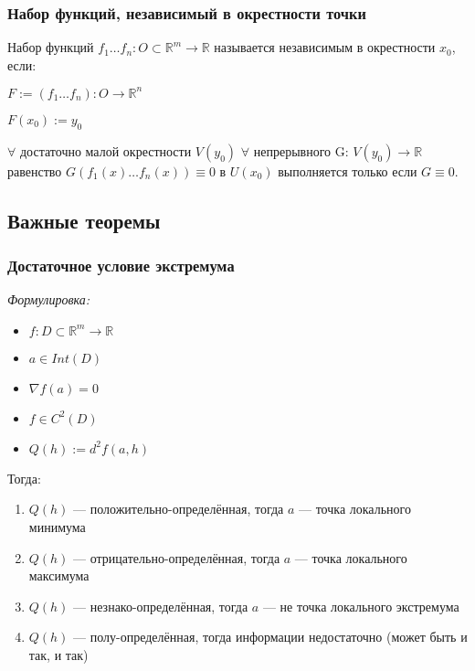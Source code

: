 \documentclass{article}
\begin{document}
\subsubsection{Набор функций, независимый в окрестности точки}


Набор функций $f_1 \ldots f_n: O \subset \mathbb{R}^m \rightarrow \mathbb{R}$ называется независимым в окрестности $x_0$, если:

$F := (f_1 \ldots f_n): O \rightarrow \mathbb{R}^n$

$F(x_0) := y_0$

$\forall$ достаточно малой окрестности $V(y_0)$ $\forall$ непрерывного G: $V(y_0) \rightarrow \mathbb{R}$ равенство $G(f_1(x) \ldots f_n(x)) \equiv 0 $ в $ U(x_0)$ выполняется только если $G \equiv 0$.

\newpage
\subsection{Важные теоремы}
\subsubsection{Достаточное условие экстремума}

\textit{Формулировка:}

\begin{itemize}
    \item $f: D \subset \mathbb{R}^m \rightarrow \mathbb{R}$
    \item $a \in Int(D)$
    \item $\nabla f (a) = 0$
    \item $f \in C^2(D)$
    \item $Q(h) := d^2f(a, h)$
\end{itemize}

Тогда: 

\begin{enumerate}
    \item $Q(h)$ --- положительно-определённая, тогда $a$ --- точка локального минимума
    \item $Q(h)$ --- отрицательно-определённая, тогда $a$ --- точка локального максимума
    \item $Q(h)$ --- незнако-определённая, тогда $a$ --- не точка локального экстремума
    \item $Q(h)$ --- полу-определённая, тогда информации недостаточно (может быть и так, и так)
\end{enumerate}
\end{document}
